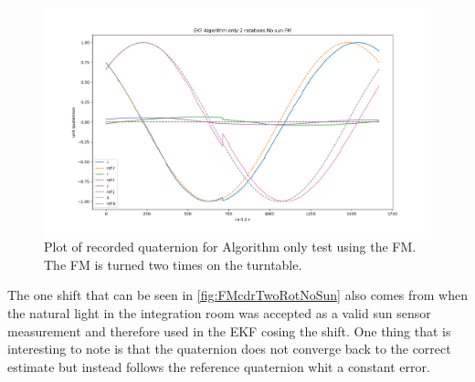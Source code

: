\begin{figure}[tbp]
	\centering
	\includegraphics[width=1\columnwidth]{./Pictures/EKF_Algorithm_only_2_rotations_No_sun_FM}
	\caption{Plot of recorded quaternion for Algorithm only test using the FM. The FM is turned two times on the turntable.}
	\label{fig:FMcdrTwoRotNoSun}
\end{figure}   

The one shift that can be seen in \autoref{fig:FMcdrTwoRotNoSun} also comes from when the natural light in the integration room was accepted as a valid sun sensor measurement and therefore used in the EKF cosing the shift. One thing that is interesting to note is that the quaternion does not converge back to the correct estimate but instead follows the reference quaternion whit a constant error.     
\fi